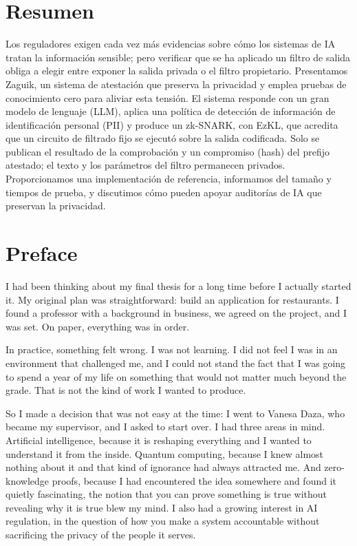 \documentclass[11pt, a4paper, twoside, openany]{tfg_dtic_upf}
\let\cleardoublepage\clearpage
\theoremstyle{definition}
\theoremstyle{plain}
\numberwithin{equation}{section}
\begin{document}
\vspace*{\fill}

\section*{\Large \sffamily Resumen}
Los reguladores exigen cada vez más evidencias sobre cómo los sistemas de IA tratan la información sensible; pero verificar que se ha aplicado un filtro de salida obliga a elegir entre exponer la salida privada o el filtro propietario. Presentamos Zaguik, un sistema de atestación que preserva la privacidad y emplea pruebas de conocimiento cero para aliviar esta tensión. El sistema responde con un gran modelo de lenguaje (LLM), aplica una política de detección de información de identificación personal (PII) y produce un zk-SNARK, con EzKL, que acredita que un circuito de filtrado fijo se ejecutó sobre la salida codificada. Solo se publican el resultado de la comprobación y un compromiso (hash) del prefijo atestado; el texto y los parámetros del filtro permanecen privados. Proporcionamos una implementación de referencia, informamos del tamaño y tiempos de prueba, y discutimos cómo pueden apoyar auditorías de IA que preservan la privacidad.

\vspace*{\fill}


\cleardoublepage

\section*{\Large \sffamily Preface}

I had been thinking about my final thesis for a long time before I actually started it. My original plan was straightforward: build an application for restaurants. I found a professor with a background in business, we agreed on the project, and I was set. On paper, everything was in order.

\medskip

In practice, something felt wrong. I was not learning. I did not feel I was in an environment that challenged me, and I could not stand the fact that I was going to spend a year of my life on something that would not matter much beyond the grade. That is not the kind of work I wanted to produce.

\medskip

So I made a decision that was not easy at the time: I went to Vanesa Daza, who became my supervisor, and I asked to start over. I had three areas in mind. Artificial intelligence, because it is reshaping everything and I wanted to understand it from the inside. Quantum computing, because I knew almost nothing about it and that kind of ignorance had always attracted me. And zero-knowledge proofs, because I had encountered the idea somewhere and found it quietly fascinating, the notion that you can prove something is true without revealing why it is true blew my mind. I also had a growing interest in AI regulation, in the question of how you make a system accountable without sacrificing the privacy of the people it serves.
\end{document}
